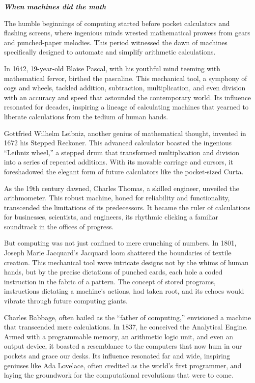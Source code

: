 \documentclass[
  letterpaper,
  DIV=11,
  numbers=noendperiod]{scrreprt}
\begin{document}
\textbf{\emph{When machines did the math}}

The humble beginnings of computing started before pocket calculators and
flashing screens, where ingenious minds wrested mathematical prowess
from gears and punched-paper melodies. This period witnessed the dawn of
machines specifically designed to automate and simplify arithmetic
calculations.

In 1642, 19-year-old Blaise Pascal, with his youthful mind teeming with
mathematical fervor, birthed the pascaline. This mechanical tool, a
symphony of cogs and wheels, tackled addition, subtraction,
multiplication, and even division with an accuracy and speed that
astounded the contemporary world. Its influence resonated for decades,
inspiring a lineage of calculating machines that yearned to liberate
calculations from the tedium of human hands.

Gottfried Wilhelm Leibniz, another genius of mathematical thought,
invented in 1672 his Stepped Reckoner. This advanced calculator boasted
the ingenious ``Leibniz wheel,'' a stepped drum that transformed
multiplication and division into a series of repeated additions. With
its movable carriage and cursors, it foreshadowed the elegant form of
future calculators like the pocket-sized Curta.

As the 19th century dawned, Charles Thomas, a skilled engineer, unveiled
the arithmometer. This robust machine, honed for reliability and
functionality, transcended the limitations of its predecessors. It
became the ruler of calculations for businesses, scientists, and
engineers, its rhythmic clicking a familiar soundtrack in the offices of
progress.

But computing was not just confined to mere crunching of numbers. In
1801, Joseph Marie Jacquard's Jacquard loom shattered the boundaries of
textile creation. This mechanical tool wove intricate designs not by the
whims of human hands, but by the precise dictations of punched cards,
each hole a coded instruction in the fabric of a pattern. The concept of
stored programs, instructions dictating a machine's actions, had taken
root, and its echoes would vibrate through future computing giants.

Charles Babbage, often hailed as the ``father of computing,'' envisioned
a machine that transcended mere calculations. In 1837, he conceived the
Analytical Engine. Armed with a programmable memory, an arithmetic logic
unit, and even an output device, it boasted a resemblance to the
computers that now hum in our pockets and grace our desks. Its influence
resonated far and wide, inspiring geniuses like Ada Lovelace, often
credited as the world's first programmer, and laying the groundwork for
the computational revolutions that were to come.
\end{document}
